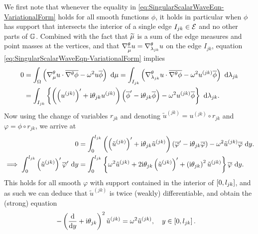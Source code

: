 We first note that whenever the equality in \eqref{eq:SingularScalarWaveEqn-VariationalForm} holds for all smooth functions $\phi$, it holds in particular when $\phi$ has support that intersects the interior of a single edge $I_{jk}\in\mathcal{E}$ and no other parts of $\mathbb{G}$.
Combined with the fact that $\widetilde{\mu}$ is a sum of the edge measures and point masses at the vertices, and that $\nabla^{\theta}_{\widetilde{\mu}}u=\nabla^{\theta}_{\lambda_{jk}}u$ on the edge $I_{jk}$, equation \eqref{eq:SingularScalarWaveEqn-VariationalForm} implies
\begin{align*}
	0 &= \int_{\Omega} \left( \nabla^{\theta}_\mu u \cdot \overline{\nabla^{\theta}\phi} - \omega^2 u\overline{\phi} \right)  \ \mathrm{d}\mu
	= \int_{I_{jk}} \left( \nabla^{\theta}_{\lambda_{jk}}u \cdot \overline{\nabla^{\theta}\phi} - \omega^2 u^{(jk)}\overline{\phi} \right)  \ \mathrm{d}\lambda_{jk} \\
	&= \int_{I_{jk}} \left\{  \left( \left( u^{(jk)} \right)' + \mathrm{i}\theta_{jk} u^{(jk)} \right)\left( \overline{\phi}' - \mathrm{i}\theta_{jk} \overline{\phi}  \right) - \omega^2 u^{(jk)}\overline{\phi}  \right\}  \ \mathrm{d}\lambda_{jk}.
\end{align*}
Now using the change of variables $r_{jk}$ and denoting $\tilde{u}^{(jk)} = u^{(jk)} \circ r_{jk}$ and $\varphi = \phi\circ r_{jk}$, we arrive at
\begin{align*}
	0 &= \int_{0}^{l_{jk}} \left( \left( \tilde{u}^{(jk)} \right)' + \mathrm{i}\theta_{jk} \tilde{u}^{(jk)} \right)\left( \overline{\varphi}' - \mathrm{i}\theta_{jk} \overline{\varphi}  \right) - \omega^2 \tilde{u}^{(jk)}\overline{\varphi} \ \mathrm{d} y. \\
	\implies
	\int_{0}^{l_{jk}} \left( \tilde{u}^{(jk)} \right)'\overline{\varphi}' \ \mathrm{d} y &=
	\int_{0}^{l_{jk}} \left\{  \omega^2\tilde{u}^{(jk)} + 2\mathrm{i}\theta_{jk}\left( \tilde{u}^{(jk)} \right)' + \left( \mathrm{i}\theta_{jk} \right)^2\tilde{u}^{(jk)}  \right\} \overline{\varphi} \ \mathrm{d} y.
\end{align*}
This holds for all smooth $\varphi$ with support contained in the interior of $\left[ 0,l_{jk} \right]$, and as such we can deduce that $\tilde{u}^{(jk)}$ is twice (weakly) differentiable, and obtain the (strong) equation
\begin{align*}
	-\left( \dfrac{\mathrm{d}}{\mathrm{d}y} + \mathrm{i}\theta_{jk} \right)^2 \tilde{u}^{(jk)} &= \omega^2 \tilde{u}^{(jk)}, \quad y\in\left[ 0,l_{jk} \right].
\end{align*}

